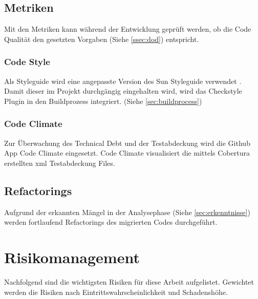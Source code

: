 \documentclass[11pt,a4paper,english,oneside]{book}
\numberwithin{equation}{chapter}
\begin{document}
	\subsection{Metriken} \label{ssec:metriken}
	Mit den Metriken kann während der Entwicklung geprüft werden, ob die Code Qualität den gesetzten Vorgaben (Siehe \ref{ssec:dod}) entspricht.
	
	\subsubsection{Code Style}
	Als Styleguide wird eine angepasste Version des Sun Styleguide verwendet \cite{suncheckstyle}. Damit dieser im Projekt durchgängig eingehalten wird, wird das Checkstyle Plugin \cite{checkstyle} in den Buildprozess integriert. (Siehe \ref{sec:buildprocess})	
	
	\subsubsection{Code Climate}
	Zur Überwachung des Technical Debt und der Testabdeckung wird die Github App Code Climate \cite{codeclimate} eingesetzt. Code Climate visualisiert die mittels Cobertura \cite{cobertura} erstellten \gls{xml} Testabdeckung Files.
	
	\subsection{Refactorings}
	Aufgrund der erkannten Mängel in der Analysephase (Siehe \ref{sec:erkenntnisse}) werden fortlaufend Refactorings des migrierten Codes durchgeführt.

	\section{Risikomanagement}
	Nachfolgend sind die wichtigsten Risiken für diese Arbeit aufgelistet. Gewichtet werden die Risiken nach Eintrittswahrscheinlichkeit und Schadenshöhe. \cite{risikomanagement}
	
\end{document}
